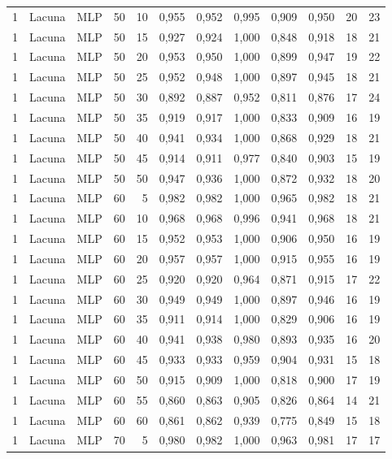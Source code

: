 \begin{longtable}{ccclrrrrrrrr}
1 & Lacuna & MLP & 50 & 10 & 0,955 & 0,952 & 0,995 & 0,909 & 0,950 & 20 & 23 \\
1 & Lacuna & MLP & 50 & 15 & 0,927 & 0,924 & 1,000 & 0,848 & 0,918 & 18 & 21 \\
1 & Lacuna & MLP & 50 & 20 & 0,953 & 0,950 & 1,000 & 0,899 & 0,947 & 19 & 22 \\
1 & Lacuna & MLP & 50 & 25 & 0,952 & 0,948 & 1,000 & 0,897 & 0,945 & 18 & 21 \\
1 & Lacuna & MLP & 50 & 30 & 0,892 & 0,887 & 0,952 & 0,811 & 0,876 & 17 & 24 \\
1 & Lacuna & MLP & 50 & 35 & 0,919 & 0,917 & 1,000 & 0,833 & 0,909 & 16 & 19 \\
1 & Lacuna & MLP & 50 & 40 & 0,941 & 0,934 & 1,000 & 0,868 & 0,929 & 18 & 21 \\
1 & Lacuna & MLP & 50 & 45 & 0,914 & 0,911 & 0,977 & 0,840 & 0,903 & 15 & 19 \\
1 & Lacuna & MLP & 50 & 50 & 0,947 & 0,936 & 1,000 & 0,872 & 0,932 & 18 & 20 \\
1 & Lacuna & MLP & 60 & 5 & 0,982 & 0,982 & 1,000 & 0,965 & 0,982 & 18 & 21 \\
1 & Lacuna & MLP & 60 & 10 & 0,968 & 0,968 & 0,996 & 0,941 & 0,968 & 18 & 21 \\
1 & Lacuna & MLP & 60 & 15 & 0,952 & 0,953 & 1,000 & 0,906 & 0,950 & 16 & 19 \\
1 & Lacuna & MLP & 60 & 20 & 0,957 & 0,957 & 1,000 & 0,915 & 0,955 & 16 & 19 \\
1 & Lacuna & MLP & 60 & 25 & 0,920 & 0,920 & 0,964 & 0,871 & 0,915 & 17 & 22 \\
1 & Lacuna & MLP & 60 & 30 & 0,949 & 0,949 & 1,000 & 0,897 & 0,946 & 16 & 19 \\
1 & Lacuna & MLP & 60 & 35 & 0,911 & 0,914 & 1,000 & 0,829 & 0,906 & 16 & 19 \\
1 & Lacuna & MLP & 60 & 40 & 0,941 & 0,938 & 0,980 & 0,893 & 0,935 & 16 & 20 \\
1 & Lacuna & MLP & 60 & 45 & 0,933 & 0,933 & 0,959 & 0,904 & 0,931 & 15 & 18 \\
1 & Lacuna & MLP & 60 & 50 & 0,915 & 0,909 & 1,000 & 0,818 & 0,900 & 17 & 19 \\
1 & Lacuna & MLP & 60 & 55 & 0,860 & 0,863 & 0,905 & 0,826 & 0,864 & 14 & 21 \\
1 & Lacuna & MLP & 60 & 60 & 0,861 & 0,862 & 0,939 & 0,775 & 0,849 & 15 & 18 \\
1 & Lacuna & MLP & 70 & 5 & 0,980 & 0,982 & 1,000 & 0,963 & 0,981 & 17 & 17 \\

\end{longtable}

